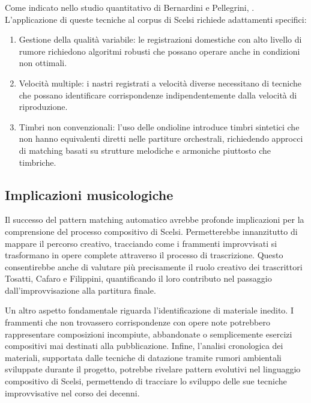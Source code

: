 Come indicato nello studio quantitativo di Bernardini e Pellegrini, . L'applicazione di queste tecniche al corpus di Scelsi richiede adattamenti specifici:
\begin{enumerate}

 \item Gestione della qualità variabile: le registrazioni domestiche con alto livello di rumore richiedono algoritmi robusti che possano operare anche in condizioni non ottimali.

 \item Velocità multiple: i nastri registrati a velocità diverse necessitano di tecniche che possano identificare corrispondenze indipendentemente dalla velocità di riproduzione.

 \item Timbri non convenzionali: l'uso delle ondioline introduce timbri sintetici che non hanno equivalenti diretti nelle partiture orchestrali, richiedendo approcci di matching basati su strutture melodiche e armoniche piuttosto che timbriche.
\end{enumerate}

\subsection{Implicazioni musicologiche}

Il successo del pattern matching automatico avrebbe profonde implicazioni per la comprensione del processo compositivo di Scelsi. Permetterebbe innanzitutto di mappare il percorso creativo, tracciando come i frammenti improvvisati si trasformano in opere complete attraverso il processo di trascrizione. Questo consentirebbe anche di valutare più precisamente il ruolo creativo dei trascrittori Tosatti, Cafaro e Filippini, quantificando il loro contributo nel passaggio dall'improvvisazione alla partitura finale.

Un altro aspetto fondamentale riguarda l'identificazione di materiale inedito. I frammenti che non trovassero corrispondenze con opere note potrebbero rappresentare composizioni incompiute, abbandonate o semplicemente esercizi compositivi mai destinati alla pubblicazione. Infine, l'analisi cronologica dei materiali, supportata dalle tecniche di datazione tramite rumori ambientali sviluppate durante il progetto, potrebbe rivelare pattern evolutivi nel linguaggio compositivo di Scelsi, permettendo di tracciare lo sviluppo delle sue tecniche improvvisative nel corso dei decenni.

